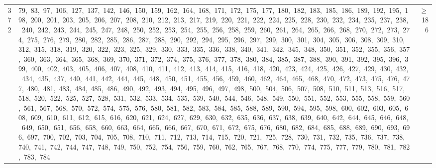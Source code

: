 \begin{longtable}{c|p{}|r}
372 & 79,\ 83,\ 97,\ 106,\ 127,\ 137,\ 142,\ 146,\ 150,\ 159,\ 162,\ 164,\ 168,\ 171,\ 172,\ 175,\ 177,\ 180,\ 182,\ 183,\ 185,\ 186,\ 189,\ 192,\ 195,\ 198,\ 200,\ 201,\ 203,\ 205,\ 206,\ 207,\ 208,\ 210,\ 212,\ 213,\ 217,\ 219,\ 220,\ 221,\ 222,\ 224,\ 225,\ 228,\ 230,\ 232,\ 234,\ 235,\ 237,\ 238,\ 240,\ 242,\ 243,\ 244,\ 245,\ 247,\ 248,\ 250,\ 252,\ 253,\ 254,\ 255,\ 256,\ 258,\ 259,\ 260,\ 261,\ 264,\ 265,\ 266,\ 268,\ 270,\ 272,\ 273,\ 274,\ 275,\ 276,\ 279,\ 280,\ 282,\ 285,\ 286,\ 287,\ 288,\ 290,\ 292,\ 294,\ 295,\ 296,\ 297,\ 299,\ 300,\ 301,\ 304,\ 305,\ 306,\ 308,\ 309,\ 310,\ 312,\ 315,\ 318,\ 319,\ 320,\ 322,\ 323,\ 325,\ 329,\ 330,\ 333,\ 335,\ 336,\ 338,\ 340,\ 341,\ 342,\ 345,\ 348,\ 350,\ 351,\ 352,\ 355,\ 356,\ 357,\ 360,\ 363,\ 364,\ 365,\ 368,\ 369,\ 370,\ 371,\ 372,\ 374,\ 375,\ 376,\ 377,\ 378,\ 380,\ 384,\ 385,\ 387,\ 388,\ 390,\ 391,\ 392,\ 395,\ 396,\ 399,\ 400,\ 402,\ 403,\ 405,\ 406,\ 407,\ 408,\ 410,\ 411,\ 412,\ 413,\ 414,\ 415,\ 416,\ 418,\ 420,\ 423,\ 424,\ 425,\ 426,\ 427,\ 429,\ 430,\ 432,\ 434,\ 435,\ 437,\ 440,\ 441,\ 442,\ 444,\ 445,\ 448,\ 450,\ 451,\ 455,\ 456,\ 459,\ 460,\ 462,\ 464,\ 465,\ 468,\ 470,\ 472,\ 473,\ 475,\ 476,\ 477,\ 480,\ 481,\ 483,\ 484,\ 485,\ 486,\ 490,\ 492,\ 493,\ 494,\ 495,\ 496,\ 497,\ 498,\ 500,\ 504,\ 506,\ 507,\ 508,\ 510,\ 511,\ 513,\ 516,\ 517,\ 518,\ 520,\ 522,\ 525,\ 527,\ 528,\ 531,\ 532,\ 533,\ 534,\ 535,\ 539,\ 540,\ 544,\ 546,\ 548,\ 549,\ 550,\ 551,\ 552,\ 553,\ 555,\ 558,\ 559,\ 560,\ 561,\ 567,\ 568,\ 570,\ 572,\ 574,\ 575,\ 576,\ 580,\ 581,\ 582,\ 583,\ 584,\ 585,\ 588,\ 589,\ 590,\ 594,\ 595,\ 598,\ 600,\ 602,\ 603,\ 605,\ 608,\ 609,\ 610,\ 611,\ 612,\ 615,\ 616,\ 620,\ 621,\ 624,\ 627,\ 629,\ 630,\ 632,\ 635,\ 636,\ 637,\ 638,\ 639,\ 640,\ 642,\ 644,\ 645,\ 646,\ 648,\ 649,\ 650,\ 651,\ 656,\ 658,\ 660,\ 663,\ 664,\ 665,\ 666,\ 667,\ 670,\ 671,\ 672,\ 675,\ 676,\ 680,\ 682,\ 684,\ 685,\ 688,\ 689,\ 690,\ 693,\ 696,\ 697,\ 700,\ 702,\ 703,\ 704,\ 705,\ 708,\ 710,\ 711,\ 712,\ 713,\ 714,\ 715,\ 720,\ 721,\ 725,\ 728,\ 730,\ 731,\ 732,\ 735,\ 736,\ 737,\ 738,\ 740,\ 741,\ 742,\ 744,\ 747,\ 748,\ 749,\ 750,\ 752,\ 754,\ 756,\ 759,\ 760,\ 762,\ 765,\ 767,\ 768,\ 770,\ 774,\ 775,\ 777,\ 779,\ 780,\ 781,\ 782,\ 783,\ 784 & $\ge$ 186 \\

\end{longtable}
